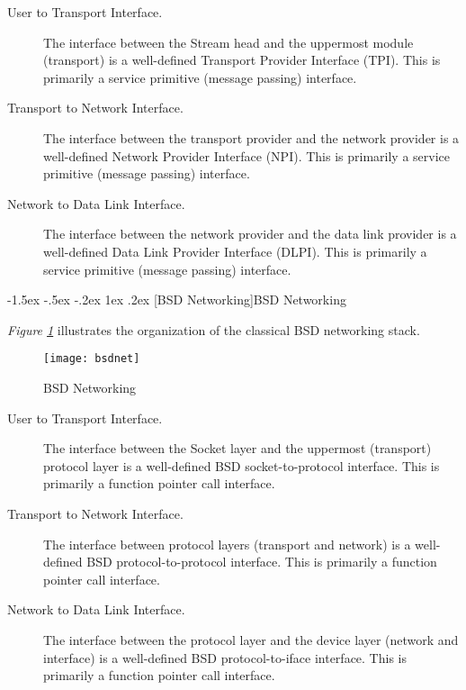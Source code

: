 \documentclass[letterpaper,final,notitlepage,twocolumn,10pt,twoside]{article}
\makeatletter
\renewcommand\subsection{\@startsection{subsection}{2}{\z@}%
                                     {-1.5ex \@plus -.5ex \@minus -.2ex}%
                                     {1ex \@plus .2ex}%
                                     {\normalfont\normalsize\bfseries}}
\makeatother
\begin{document}
\begin{description}

\item[User to Transport Interface.]

The interface between the Stream head and the uppermost module (transport) is
a well-defined Transport Provider Interface (TPI).  This is primarily a
service primitive (message passing) interface.

\item[Transport to Network Interface.]

The interface between the transport provider and the network provider is a
well-defined Network Provider Interface (NPI).  This is primarily a service
primitive (message passing) interface.

\item[Network to Data Link Interface.]

The interface between the network provider and the data link provider is a
well-defined Data Link Provider Interface (DLPI).  This is primarily a service
primitive (message passing) interface.

\end{description}

\subsection[BSD Networking]{BSD Networking}

\textit{Figure \ref{figure:bsdnet}} illustrates the organization of the
classical BSD networking stack.

\begin{figure}[hbtp]
\begin{center}
\texttt{[image: bsdnet]}
\end{center}
\caption[BSD Networking]{BSD Networking}
\label{figure:bsdnet}
\end{figure}

\begin{description}

\item[User to Transport Interface.]

The interface between the Socket layer and the uppermost (transport) protocol
layer is a well-defined BSD socket-to-protocol interface.
This is primarily a function pointer call interface.

\item[Transport to Network Interface.]

The interface between protocol layers (transport and network) is a
well-defined BSD protocol-to-protocol interface.
This is primarily a function pointer call interface.

\item[Network to Data Link Interface.]

The interface between the protocol layer and the device layer (network and
interface) is a well-defined BSD protocol-to-iface interface.
This is primarily a function pointer call interface.

\end{description}
\end{document}
